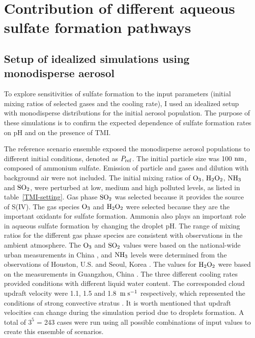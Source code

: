 \documentclass[edeposit,fullpage]{uiucthesis2009}
\makeatletter
\DeclareRobustCommand*\unit[1]
 {\ensuremath{%
   {\thinmuskip3mu\relax
    \def\mu{\text{\textmu}}\def~{\,}%
    \ifx\f@series\testbx\mathbf{#1}\else\mathrm{#1}\fi}}}
\makeatother
\begin{document}
\section{Contribution of different aqueous sulfate formation pathways}
\label{chap2.4}
\subsection{Setup of idealized simulations using monodisperse aerosol}
To explore sensitivities of sulfate formation to the input parameters
(initial mixing ratios of selected gases and the cooling rate), I used
an idealized setup with monodisperse distributions for the initial
aerosol population. The purpose of these simulations is to confirm the
expected dependence of sulfate formation rates on pH and on the
presence of TMI.

The reference scenario ensemble exposed the monodisperse aerosol
populations to different initial conditions, denoted as $P_{\rm
  ref}$. The initial particle size was 100 \unit{nm}, composed of
ammonium sulfate. Emission of particle and gases and dilution with
background air were not included. The initial mixing ratios of $\rm
O_3$, $\rm H_2O_2$, $\rm NH_3$ and $\rm SO_2$, were perturbed at low,
medium and high polluted levels, as listed in
table~\ref{TMI-setting}. Gas phase $\rm SO_2$ was selected because it
provides the source of S(IV). The gas species $\rm O_3$ and $\rm
H_2O_2$ were selected because they are the important oxidants for
sulfate formation.  Ammonia also plays an important role in aqueous
sulfate formation by changing the droplet pH. The range of mixing
ratios for the different gas phase species are consistent with
observations in the ambient atmosphere. The $\rm O_3$ and $\rm SO_2$
values were based on the national-wide urban measurements in China
\citep{wang2014spatial}, and $\rm NH_3$ levels were determined from
the observations of Houston, U.S. \citep{nowak2010airborne} and Seoul,
Korea \citep{phan2013analysis}. The values for $\rm H_2O_2$ were based
on the measurements in Guangzhou, China
\citep{hua2008atmospheric}. The three different cooling rates provided
conditions with different liquid water content. The corresponded cloud
updraft velocity were 1.1, 1.5 and 1.8~\unit{m\;s^{-1}} respectively,
which represented the conditions of strong convective stratus
\citep{peng2005importance}. It is worth mentioned that updraft
velocities can change during the simulation period due to droplets
formation. A total of $3^5$ = 243 cases were run using all possible
combinations of input values to create this ensemble of scenarios.
\end{document}
